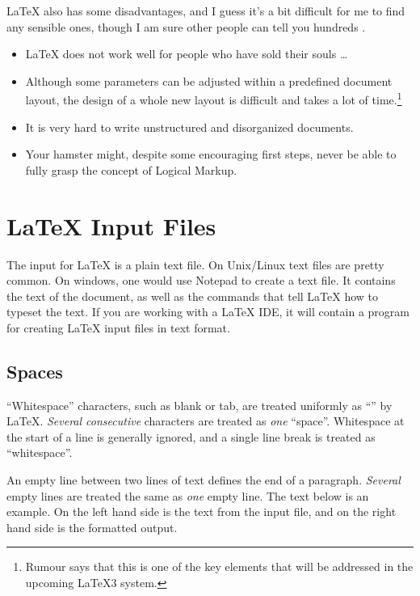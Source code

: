 \medskip

\noindent\LaTeX{} also has some disadvantages, and I guess it's a bit
difficult for me to find any sensible ones, though I am sure other people
can tell you hundreds \smiley.

\begin{itemize}
  \item \LaTeX{} does not work well for people who have sold their
        souls \ldots
  \item Although some parameters can be adjusted within a predefined
        document layout, the design of a whole new layout is difficult and
        takes a lot of time.\footnote{Rumour says that this is one of the
          key elements that will be addressed in the upcoming \LaTeX3
          system.}
  \item It is very hard to write unstructured and disorganized documents.
  \item Your hamster might, despite some encouraging first steps, never be
        able to fully grasp the concept of Logical Markup.
\end{itemize}

\section{\LaTeX{} Input Files}

The input for \LaTeX{} is a plain text file. On Unix/Linux text files are
pretty common. On windows, one would use Notepad to create a text file. It
contains the text of the document, as well as the commands that tell
\LaTeX{} how to typeset the text. If you are working with a \LaTeX{} IDE, it will contain a program for creating
\LaTeX{} input files in text format.

\subsection{Spaces}

``Whitespace'' characters, such as blank or tab, are
treated uniformly as ``'' by \LaTeX{}. \emph{Several
  consecutive}  characters are treated as \emph{one}
``space''.  Whitespace at the start of a line is generally ignored, and
a single line break is treated as ``whitespace''.

An empty line between two lines of text defines the end of a
paragraph. \emph{Several} empty lines are treated the same as
\emph{one} empty line. The text below is an example. On the left hand
side is the text from the input file, and on the right hand side is the
formatted output.


